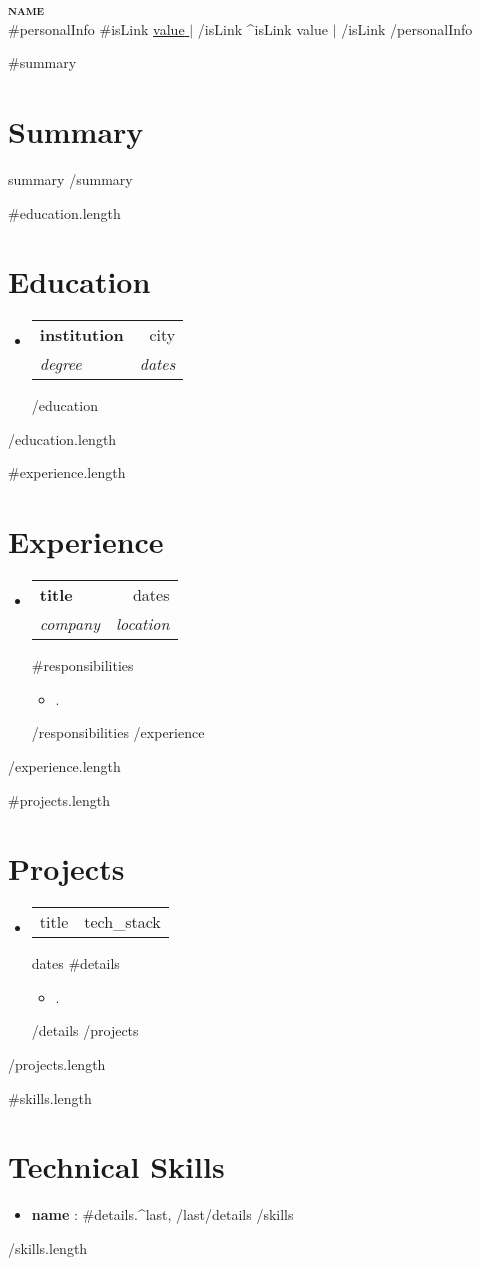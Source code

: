 \documentclass[letterpaper,11pt]{article}
\newcommand{\resumeItem}[1]{
  \item\small{
    {#1 \vspace{-2pt}}
  }
}
\newcommand{\resumeSubheading}[4]{
  \vspace{-2pt}\item
    \begin{tabularx}{\textwidth}{Xr}
      \textbf{#1} & #2 \\
      \textit{\small#3} & \textit{\small #4} \\
    \end{tabularx}\vspace{-7pt}
}
\newcommand{\resumeProjectHeading}[2]{
    \item
    \begin{tabularx}{\textwidth}{Xr}
      \small #1 & #2 \\
    \end{tabularx}\vspace{-7pt}
}
\newcommand{\resumeSubHeadingListStart}{\begin{itemize}[leftmargin=0.15in, label={}]}
\newcommand{\resumeSubHeadingListEnd}{\end{itemize}}
\newcommand{\resumeItemListStart}{\begin{itemize}}
\newcommand{\resumeItemListEnd}{\end{itemize}\vspace{-12pt}}
\begin{document}
\begin{center}
    \textbf{\Huge \scshape {{name}}} \\ \vspace{1pt}
    {{#personalInfo}}
      {{#isLink}}
        \small \href{ {{{link}}} }{ {{value}} } $|$
      {{/isLink}}
      {{^isLink}}
        \small {{value}} $|$
      {{/isLink}}
    {{/personalInfo}}
\end{center}

{{#summary}}
\section{Summary}
{{summary}}
{{/summary}}

{{#education.length}}
\section{Education}
  \resumeSubHeadingListStart
  {{#education}}
    \resumeSubheading
      {{institution}} { {{city}} }
      {{degree}} { {{dates}} }
  {{/education}}
  \resumeSubHeadingListEnd
{{/education.length}}

{{#experience.length}}
\section{Experience}
  \resumeSubHeadingListStart
  {{#experience}}
    \resumeSubheading
      {{title}} { {{dates}} }
      {{company}} { {{location}} }
      {{#responsibilities}}
      \resumeItemListStart
        \resumeItem{{.}}
      \resumeItemListEnd
      {{/responsibilities}}
  {{/experience}}
  \resumeSubHeadingListEnd
{{/experience.length}}

{{#projects.length}}
\section{Projects}
  \resumeSubHeadingListStart
  {{#projects}}
    \resumeProjectHeading
      {{title}} { {{tech_stack}} } { {{dates}} }
      {{#details}}
      \resumeItemListStart
        \resumeItem{{.}}
      \resumeItemListEnd
      {{/details}}
  {{/projects}}
  \resumeSubHeadingListEnd
{{/projects.length}}

{{#skills.length}}
\section{Technical Skills}
  \resumeSubHeadingListStart
  {{#skills}}
    \item \textbf{{name}} : {{#details}}{{.}}{{^last}}, {{/last}}{{/details}}
  {{/skills}}
  \resumeSubHeadingListEnd
{{/skills.length}}
\end{document}
